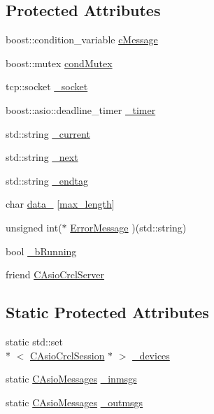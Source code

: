 \subsection*{Protected Attributes}
\begin{DoxyCompactItemize}
\item 
boost\-::condition\-\_\-variable \hyperlink{classCAsioCrclSession_ac3008f28bb46669c7c4693dc49c9c183}{c\-Message}
\item 
boost\-::mutex \hyperlink{classCAsioCrclSession_a6c8fdf25cfe9645eb0e3d0b9e56c6e07}{cond\-Mutex}
\item 
tcp\-::socket \hyperlink{classCAsioCrclSession_ab92574f487782a95cb9eb745fd1de536}{\-\_\-socket}
\item 
boost\-::asio\-::deadline\-\_\-timer \hyperlink{classCAsioCrclSession_a98a3308f0d6e8dd4c24d85fcc11ce87d}{\-\_\-timer}
\item 
std\-::string \hyperlink{classCAsioCrclSession_a83efc0f203f9775669ad7853fdea60ec}{\-\_\-current}
\item 
std\-::string \hyperlink{classCAsioCrclSession_a332547f983c0b36b09933d9255dac802}{\-\_\-next}
\item 
std\-::string \hyperlink{classCAsioCrclSession_afff0bce2718c39db205c779ade8120bd}{\-\_\-endtag}
\item 
char \hyperlink{classCAsioCrclSession_a1326999cd8dde70d8d69a4243ccba767}{data\-\_\-} \mbox{[}\hyperlink{classCAsioCrclSession_a459056f275a7910eeaf4f1ce2a4d48e3a5e7b7a77c3bed2e03563151933b78440}{max\-\_\-length}\mbox{]}
\item 
unsigned int($\ast$ \hyperlink{classCAsioCrclSession_a1bd7e2c7fd02f1445f000248d908d069}{Error\-Message} )(std\-::string)
\item 
bool \hyperlink{classCAsioCrclSession_ac97a9f193eb4f46f1d144b6fabbe57d5}{\-\_\-b\-Running}
\item 
friend \hyperlink{classCAsioCrclSession_a9e3323a53591358adfce25ddf9ae580f}{C\-Asio\-Crcl\-Server}
\end{DoxyCompactItemize}
\subsection*{Static Protected Attributes}
\begin{DoxyCompactItemize}
\item 
static std\-::set\\*
$<$ \hyperlink{classCAsioCrclSession}{C\-Asio\-Crcl\-Session} $\ast$ $>$ \hyperlink{classCAsioCrclSession_a4aa68b6c8b8196d9ed9b3f35666a3d68}{\-\_\-devices}
\item 
static \hyperlink{AsioCrclServer_8h_a1437e07e96384f32c0bd411135742579}{C\-Asio\-Messages} \hyperlink{classCAsioCrclSession_a35d708bc55a91795905e27ee3c69c3ec}{\-\_\-inmsgs}
\item 
static \hyperlink{AsioCrclServer_8h_a1437e07e96384f32c0bd411135742579}{C\-Asio\-Messages} \hyperlink{classCAsioCrclSession_a450b2bbbfaf1376f80e68fe3d43507fc}{\-\_\-outmsgs}
\end{DoxyCompactItemize}



